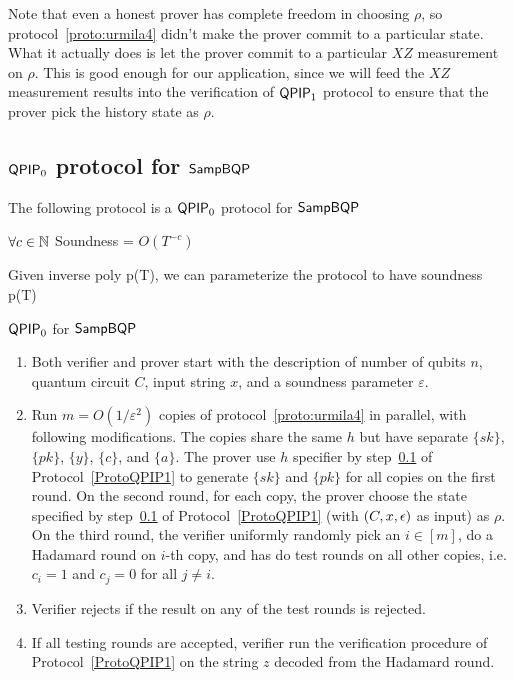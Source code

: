 \begin{rmk}
Note that even a honest prover has complete freedom in choosing $\rho$, so protocol~\ref{proto:urmila4} didn't make the prover commit to a particular state. What it actually does is let the prover commit to a particular $XZ$ measurement on $\rho$. This is good enough for our application, since we will feed the $XZ$ measurement results into the verification of $\operatorname{\mathsf{QPIP}}_1$ protocol to ensure that the prover pick the history state as $\rho$.
\end{rmk}

\subsection{$\operatorname{\mathsf{QPIP}}_0$ protocol for $\operatorname{\mathsf{SampBQP}}$}

The following protocol is a $\operatorname{\mathsf{QPIP}}_0$ protocol for $\operatorname{\mathsf{SampBQP}}$

$\forall c\in\mathbb{N}$ Soundness = $O(T^{-c})$

Given inverse poly p(T), we can parameterize the protocol to have soundness p(T)




\begin{protocol}{$\operatorname{\mathsf{QPIP}}_0$ for $\operatorname{\mathsf{SampBQP}}$}
\label{proto:QPIP0samp}
\begin{enumerate}
    \item Both verifier and prover start with the description of number of qubits $n$, quantum circuit $C$, input string $x$, and  a soundness parameter $\varepsilon$.
    \item Run $m=O(1/\varepsilon^2)$ copies of protocol~\ref{proto:urmila4} in parallel, with following modifications. The copies share the same $h$ but have separate $\{sk\}$, $\{pk\}$, $\{y\}$, $\{c\}$, and $\{a\}$.  The prover use $h$ specifier by step~\ref{} of Protocol~\ref{ProtoQPIP1} to generate $\{sk\}$ and $\{pk\}$ for all copies on the first round. On the second round, for each copy, the prover choose the state specified by step~\ref{} of Protocol~\ref{ProtoQPIP1}  (with  $(C,x,\epsilon)$ as input) as $\rho$. On the third round, the verifier uniformly randomly pick an $i\in [m]$, do a Hadamard round on $i$-th copy, and has do test rounds on all other copies, i.e. $c_i=1$ and $c_j=0$ for all $j\neq i$.
    \item \label{step:multi-testing}Verifier rejects if the result on any of the test rounds is rejected. 
    \item If all testing rounds are accepted, verifier run the verification procedure of Protocol~\ref{ProtoQPIP1} on the string $z$ decoded from the Hadamard round.
\end{enumerate}
\end{protocol}

